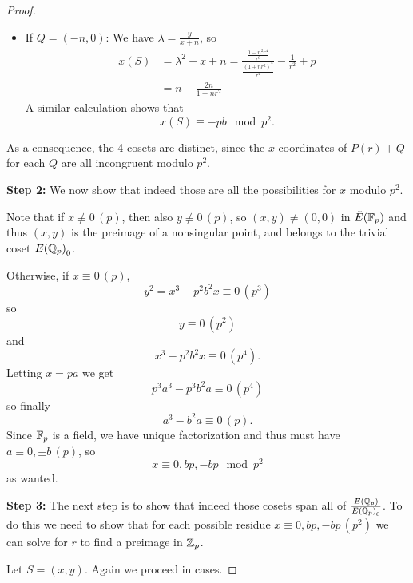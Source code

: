 \documentclass[12pt, a4paper]{amsart}
\begin{document}
\begin{proof}
\begin{itemize}
  \item If $Q = (-n, 0)$: We have $\lambda = \frac{y}{x+n}$, so
  \begin{equation*}
    \begin{split}
      x(S)
      &= \lambda^2 - x + n = 
      \frac{\frac{1 - n^2r^4}{r^6}}{\frac{(1+nr^2)^2}{r^4}} -
      \frac{1}{r^2} + p \\
      &= n - \frac{2n}{1+nr^2}
    \end{split}
  \end{equation*}
  A similar calculation shows that 
  \[x(S) \equiv -pb \mod{p^2}.\]
  \end{itemize}

  As a consequence, the 4 cosets are distinct, since the $x$ coordinates of
  $P(r) + Q$ for each $Q$ are all incongruent modulo $p^2$.

  \textbf{Step 2:} We now show that indeed those are all the possibilities for $x$ modulo $p^2$.

  Note that if $x \not\equiv 0 \, (p)$, then also $y \not\equiv 0 \, (p)$, so
  $(x,y) \neq (0,0)$ in ${\tilde{E}(\mathbb{F}_p)}$ and thus $(x,y)$ is the preimage of a nonsingular
  point, and belongs to the trivial coset ${E({\mathbb Q}_p)}_0$.

  Otherwise, if $x \equiv 0 \, (p)$,
  \[y^2 = x^3 - p^2b^2x\equiv 0 \,(p^3)\]
  so
  \[y \equiv 0 \, (p^2)\]
  and
  \[ x^3-p^2b^2x \equiv 0 \, (p^4).\]
  Letting $x = pa$ we get
  \[p^3a^3-p^3b^2a \equiv 0 \, (p^4)\]
  so finally
  \[a^3 - b^2a \equiv 0 \, (p).\]
  Since $\mathbb{F}_p$ is a field, we have unique factorization and thus must have
  $a \equiv 0, \pm b \, (p)$, so
  \[x \equiv 0, bp, -bp \mod{p^2}\]
  as wanted.

  \textbf{Step 3:} The next step is to show that indeed those cosets span all of
  $\frac{{E({\mathbb Q}_p)}}{{E({\mathbb Q}_p)}_0}$. To do this we need to show that for each possible
  residue $x \equiv 0, bp, -bp \, (p^2)$ we can solve for $r$ to find a preimage
  in ${\mathbb Z}_p$.

  Let $S = (x,y).$ Again we proceed in cases.


\end{proof}
\end{document}

